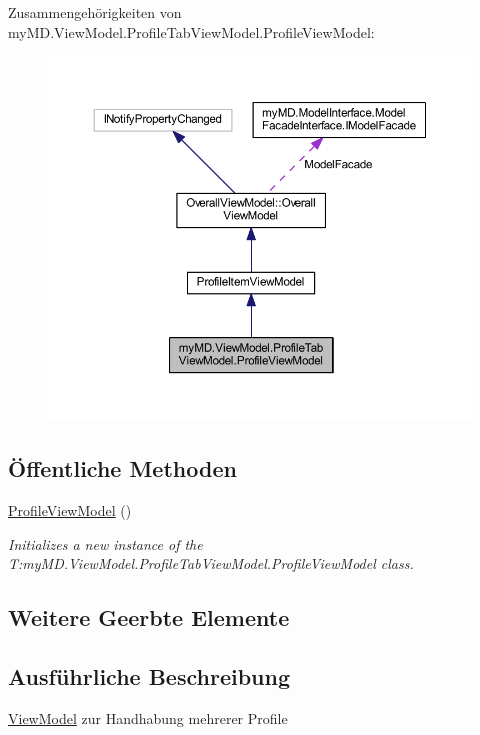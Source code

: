 Zusammengehörigkeiten von my\+M\+D.\+View\+Model.\+Profile\+Tab\+View\+Model.\+Profile\+View\+Model\+:
\nopagebreak
\begin{figure}[H]
\begin{center}
\leavevmode
\includegraphics[width=350pt]{classmy_m_d_1_1_view_model_1_1_profile_tab_view_model_1_1_profile_view_model__coll__graph}
\end{center}
\end{figure}
\subsection*{Öffentliche Methoden}
\begin{DoxyCompactItemize}
\item 
\mbox{\hyperlink{classmy_m_d_1_1_view_model_1_1_profile_tab_view_model_1_1_profile_view_model_aa7d7cd132645a689b99eccd006b51c40}{Profile\+View\+Model}} ()
\begin{DoxyCompactList}\small\item\em Initializes a new instance of the T\+:my\+M\+D.\+View\+Model.\+Profile\+Tab\+View\+Model.\+Profile\+View\+Model class. \end{DoxyCompactList}\end{DoxyCompactItemize}
\subsection*{Weitere Geerbte Elemente}


\subsection{Ausführliche Beschreibung}
\mbox{\hyperlink{namespacemy_m_d_1_1_view_model}{View\+Model}} zur Handhabung mehrerer Profile 



